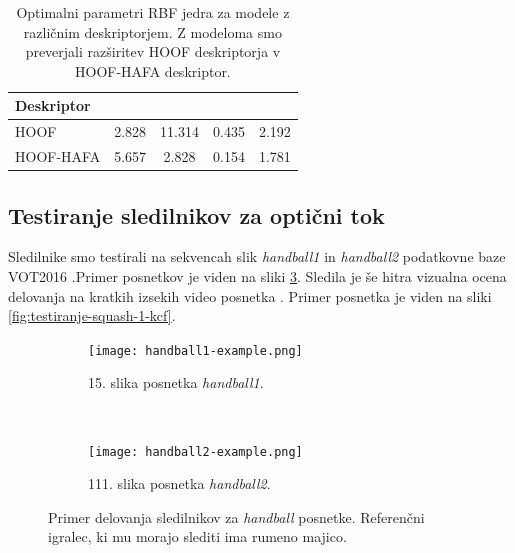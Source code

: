 \begin{table}[htb]
	\centering
	\begin{tabular}{l S[table-format=2.3] S[table-format=1.3] S[table-format=1.3] S[table-format=1.3]}
		\toprule
		\textbf{Deskriptor} &  & \thead{$\mathbf{\gamma}$} & \thead{$\mathbf{\epsilon}$} &  \\ 
		\midrule
		HOOF & 2.828 & 11.314 & 0.435 & 2.192 \\
		HOOF-HAFA & 5.657 & 2.828 & 0.154 & 1.781 \\
		\bottomrule
	\end{tabular}
	\caption[Optimalni parameteri RBF jedra modelov za izbiro deskriptorjev]{Optimalni parametri RBF jedra za modele z različnim deskriptorjem. Z modeloma smo preverjali razširitev HOOF deskriptorja v HOOF-HAFA deskriptor.}
	\label{tab:izbira-param}
\end{table}














\subsection{Testiranje sledilnikov za optični tok}\label{sec:testiranje-sledilnikov-za-opticni-tok}
Sledilnike smo testirali na sekvencah slik \textit{handball1} in \textit{handball2} podatkovne baze VOT2016 \cite{kristan2016visual}.Primer posnetkov je viden na sliki \ref{fig:testiranje-tracker-visual}. Sledila je še hitra vizualna ocena delovanja na kratkih izsekih video posnetka \cite{squashtv2014squash}. Primer posnetka je viden na sliki \ref{fig:testiranje-squash-1-kcf}.

\begin{figure}[!htbp]
	\centering
	
	\begin{subfigure}[t]{0.45\columnwidth}
		\texttt{[image: handball1-example.png]}
		\caption{15. slika posnetka \textit{handball1}.}
		\label{fig:testiranje-handball1}
	\end{subfigure}
	~
	\begin{subfigure}[t]{0.45\columnwidth}
		\texttt{[image: handball2-example.png]}
		\caption{111. slika posnetka \textit{handball2}.}
		\label{fig:testiranje-handball2}
	\end{subfigure}  
	\caption[Primer delovanja sledilnikov za \textit{handball} posnetke]{Primer delovanja sledilnikov za \textit{handball} posnetke. Referenčni igralec, ki mu morajo slediti ima rumeno majico. }
	\label{fig:testiranje-tracker-visual}
\end{figure}



